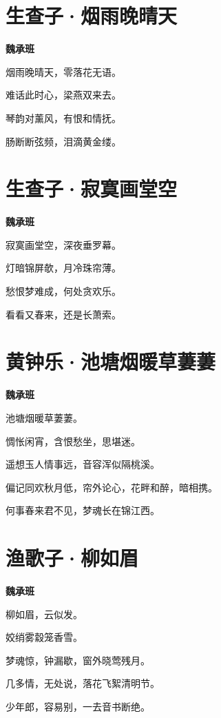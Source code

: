 \documentclass[12pt,a4paper]{ctexbook}
\begin{document}
\section{生查子·烟雨晚晴天}
\textbf{魏承班}\par\vspace{0.5em}
烟雨晚晴天，零落花无语。\par
难话此时心，梁燕双来去。\par
琴韵对薰风，有恨和情抚。\par
肠断断弦频，泪滴黄金缕。\par

\section{生查子·寂寞画堂空}
\textbf{魏承班}\par\vspace{0.5em}
寂寞画堂空，深夜垂罗幕。\par
灯暗锦屏欹，月冷珠帘薄。\par
愁恨梦难成，何处贪欢乐。\par
看看又春来，还是长萧索。\par

\section{黄钟乐·池塘烟暖草萋萋}
\textbf{魏承班}\par\vspace{0.5em}
池塘烟暖草萋萋。\par
惆怅闲宵，含恨愁坐，思堪迷。\par
遥想玉人情事远，音容浑似隔桃溪。\par
偏记同欢秋月低，帘外论心，花畔和醉，暗相携。\par
何事春来君不见，梦魂长在锦江西。\par

\section{渔歌子·柳如眉}
\textbf{魏承班}\par\vspace{0.5em}
柳如眉，云似发。\par
姣绡雾縠笼香雪。\par
梦魂惊，钟漏歇，窗外晓莺残月。\par
几多情，无处说，落花飞絮清明节。\par
少年郎，容易别，一去音书断绝。\par
\end{document}
